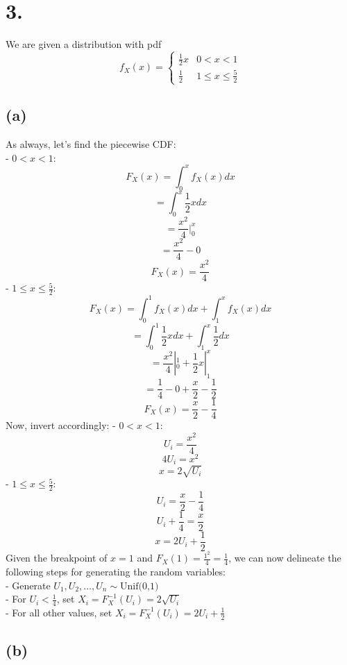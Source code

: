 \documentclass{article}
\begin{document}
{\Large 

\section*{3.}

We are given a distribution with pdf 
\[ 
  f_X(x) = 
  \begin{cases} 
    \frac{1}{2}x & 0 < x < 1 \\
    \frac{1}{2} & 1 \leq x \leq \frac{5}{2}
  \end{cases} 
\]

\subsection*{(a)} 

As always, let's find the piecewise CDF: \\
- \(0 < x < 1\): 
\[
  F_X(x) = \int_0^x f_X(x) dx
\]
\[
  = \int_0^x \frac{1}{2}x dx
\]
\[
  = \frac{x^2}{4} |_0^x 
\]
\[
  = \frac{x^2}{4} - 0 
\]
\[
  F_X(x) = \frac{x^2}{4}
\]
- \(1 \leq x \leq \frac{5}{2}\): \\
\[
  F_X(x) = \int_0^1 f_X(x) dx + \int_1^x f_X(x) dx
\]
\[
  = \int_0^1 \frac{1}{2}x dx + \int_1^x \frac{1}{2} dx
\]
\[
  = \frac{x^2}{4} |_0^1 + \frac{1}{2}x |_1^x
\]
\[
  = \frac{1}{4} - 0 + \frac{x}{2} - \frac{1}{2}
\]
\[
  F_X(x )= \frac{x}{2} - \frac{1}{4}
\]
Now, invert accordingly:
- \(0 < x < 1\):
\[
  U_i = \frac{x^2}{4}
\]
\[
  4U_i = x^2
\]
\[
  x = 2\sqrt{U_i}
\]
- \(1 \leq x \leq \frac{5}{2}\):
\[
  U_i = \frac{x}{2} - \frac{1}{4}
\]
\[
  U_i + \frac{1}{4} = \frac{x}{2}
\]
\[
  x = 2U_i + \frac{1}{2}
\]
Given the breakpoint of \(x = 1\) and \(F_X(1) = \frac{1^2}{4} = \frac{1}{4}\), we can now delineate the following steps for generating the random variables: \\
- Generate \(U_1, U_2, \dots, U_n \sim \text{Unif(0,1)}\) \\ 
- For \(U_i < \frac{1}{4}\), set \(X_i = F^{-1}_X(U_i) = 2\sqrt{U_i}\) \\
- For all other values, set \(X_i = F^{-1}_X(U_i) = 2U_i + \frac{1}{2} \)

\subsection*{(b)}

}
\end{document}
